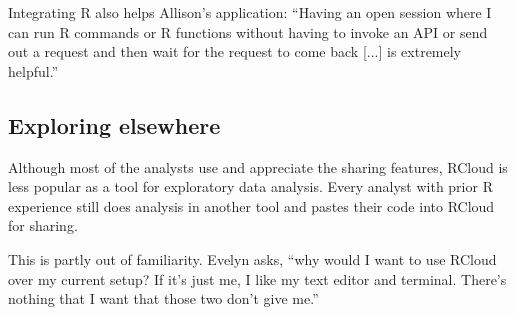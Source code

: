 Integrating R also helps Allison's application: ``Having an open session
where I can run R commands or R functions without having to invoke an API
or send out a request and then wait for the request to come back [...] is
extremely helpful.''




\subsection{Exploring elsewhere}

Although most of the analysts use and appreciate the sharing features,
RCloud is less popular as a tool for exploratory data analysis. Every
analyst with prior R experience still does analysis in another tool and
pastes their code into RCloud for sharing.

This is partly out of familiarity. Evelyn asks, ``why would I want to use
RCloud over my current setup? If it's just me, I like my text editor and
terminal. There's nothing that I want that those two don't give me.''




